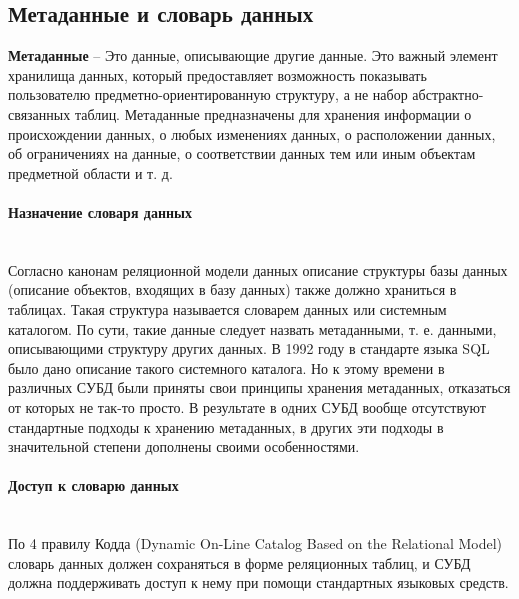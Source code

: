 \subsection{Метаданные и словарь данных}

\begin{grayquote}
	\textbf{Метаданные} -- Это данные, описывающие другие данные. Это важный
элемент хранилища данных, который предоставляет возможность показывать пользователю предметно-ориентированную структуру, а не набор абстрактно-связанных таблиц. Метаданные предназначены для хранения
информации о происхождении данных, о любых изменениях данных, о
расположении данных, об ограничениях на данные, о соответствии данных тем или иным объектам предметной области и т. д. \autocite{Pirogov2009}
\end{grayquote}

\paragraph{Назначение словаря данных} ~\\

Согласно канонам реляционной модели данных описание структуры базы
данных (описание объектов, входящих в базу данных) также должно храниться в таблицах. Такая структура называется словарем данных или системным каталогом. По сути, такие данные следует назвать метаданными, т. е. данными, описывающими структуру других
данных.
В 1992 году в стандарте языка SQL было дано описание такого системного
каталога. Но к этому времени в различных СУБД были приняты свои принципы хранения метаданных, отказаться от которых не так-то просто. В результате в одних СУБД вообще отсутствуют стандартные подходы к хранению метаданных, в других эти подходы в значительной степени дополнены своими особенностями. \autocite{Pirogov2009}
\paragraph{Доступ к словарю данных} ~\\

По 4 правилу Кодда (Dynamic On-Line Catalog Based on the Relational Model) словарь данных должен сохраняться в форме реляционных
таблиц, и СУБД должна поддерживать доступ к нему при
помощи стандартных языковых средств.

